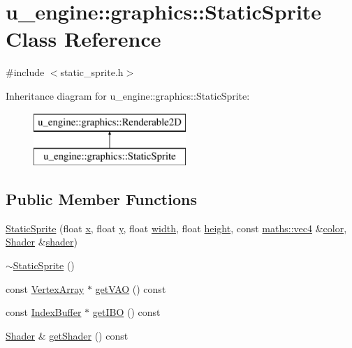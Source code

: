 \hypertarget{classu__engine_1_1graphics_1_1_static_sprite}{}\section{u\+\_\+engine\+:\+:graphics\+:\+:Static\+Sprite Class Reference}
\label{classu__engine_1_1graphics_1_1_static_sprite}


{\ttfamily \#include $<$static\+\_\+sprite.\+h$>$}

Inheritance diagram for u\+\_\+engine\+:\+:graphics\+:\+:Static\+Sprite\+:\begin{figure}[H]
\begin{center}
\leavevmode
\includegraphics[height=2.000000cm]{classu__engine_1_1graphics_1_1_static_sprite}
\end{center}
\end{figure}
\subsection*{Public Member Functions}
\begin{DoxyCompactItemize}
\item 
\hyperlink{classu__engine_1_1graphics_1_1_static_sprite_ad105ab0dce536bae761fe6e37e0d0b05}{Static\+Sprite} (float \hyperlink{glew_8h_ad77deca22f617d3f0e0eb786445689fc}{x}, float \hyperlink{glew_8h_a9298c7ad619074f5285b32c6b72bfdea}{y}, float \hyperlink{glew_8h_aa105b18f96e6bc2485cb7f576a7fb9ba}{width}, float \hyperlink{glew_8h_aa214bd63e12f7ddf524c83894fcc69a7}{height}, const \hyperlink{structu__engine_1_1maths_1_1vec4}{maths\+::vec4} \&\hyperlink{glew_8h_a3ea846f998d64f079b86052b6c4193a8}{color}, \hyperlink{classu__engine_1_1graphics_1_1_shader}{Shader} \&\hyperlink{glew_8h_a57b2a96adb1d51204909a82d861e395e}{shader})
\item 
\hyperlink{classu__engine_1_1graphics_1_1_static_sprite_a1c116dae0aed78c3f4f6cc6e91f47c07}{$\sim$\+Static\+Sprite} ()
\item 
const \hyperlink{classu__engine_1_1graphics_1_1_vertex_array}{Vertex\+Array} $\ast$ \hyperlink{classu__engine_1_1graphics_1_1_static_sprite_a509d453a7df4435ad3e1470aca77a355}{get\+V\+A\+O} () const 
\item 
const \hyperlink{classu__engine_1_1graphics_1_1_index_buffer}{Index\+Buffer} $\ast$ \hyperlink{classu__engine_1_1graphics_1_1_static_sprite_afd7a4ed2a17dbabc7f3b944638cf480b}{get\+I\+B\+O} () const 
\item 
\hyperlink{classu__engine_1_1graphics_1_1_shader}{Shader} \& \hyperlink{classu__engine_1_1graphics_1_1_static_sprite_a2368c7eb0b4556dec5ee324ce30ccc4a}{get\+Shader} () const 
\end{DoxyCompactItemize}
